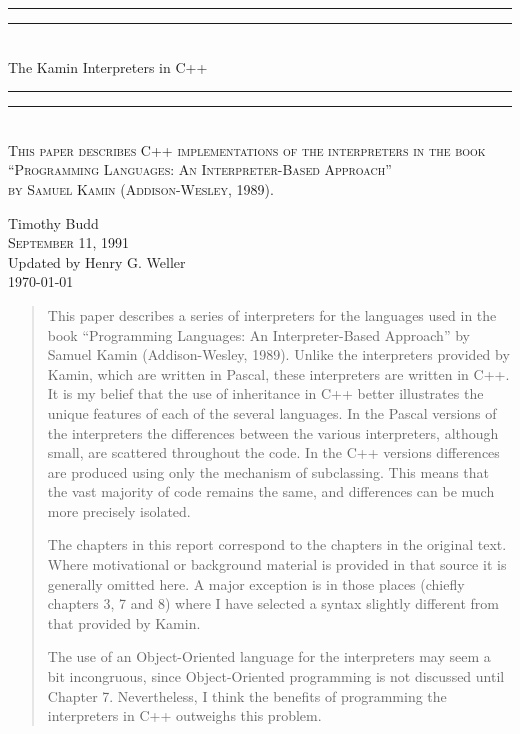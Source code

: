 \documentclass[10pt,twoside,a4paper]{report}
\newlength{\drop}
\begin{document}
\begin{titlepage}
    \textheight
    \centering
    \vspace*{\baselineskip}
    \rule{\textwidth}{1.6pt}\vspace*{-\baselineskip}\vspace*{2pt}
    \rule{\textwidth}{0.4pt}\\[\baselineskip]
    {\LARGE The Kamin Interpreters in C++}\\[0.2\baselineskip]
    \rule{\textwidth}{0.4pt}\vspace*{-\baselineskip}\vspace{3.2pt}
    \rule{\textwidth}{1.6pt}\\[\baselineskip]
    \scshape
    This paper describes C++ implementations of the interpreters in the book \\
    ``Programming Languages: An Interpreter-Based Approach'' \\
    by Samuel Kamin (Addison-Wesley, 1989).\par
    \vspace*{2\baselineskip}
    Timothy Budd \\
    {\scshape September 11, 1991}  \\[\baselineskip]
    Updated by Henry G. Weller \\
    {\scshape \today}
\end{titlepage}

\cleardoublepage

\begin{abstract}
    This paper describes a series of interpreters for the languages used in the
    book ``Programming Languages: An Interpreter-Based Approach'' by Samuel
    Kamin (Addison-Wesley, 1989).  Unlike the interpreters provided by Kamin,
    which are written in Pascal, these interpreters are written in C++.  It is
    my belief that the use of inheritance in C++ better illustrates the unique
    features of each of the several languages.  In the Pascal versions of the
    interpreters the differences between the various interpreters, although
    small, are scattered throughout the code.  In the C++ versions differences
    are produced using only the mechanism of subclassing.  This means that the
    vast majority of code remains the same, and differences can be much more
    precisely isolated.

    The chapters in this report correspond to the chapters in the original text.
    Where motivational or background material is provided in that source it is
    generally omitted here.  A major exception is in those places (chiefly
    chapters 3, 7 and 8) where I have selected a syntax slightly different from
    that provided by Kamin.

    The use of an Object-Oriented language for the interpreters may seem a bit
    incongruous, since Object-Oriented programming is not discussed until
    Chapter 7.  Nevertheless, I think the benefits of programming the
    interpreters in C++ outweighs this problem.
\end{abstract}

\tableofcontents
\listoffigures
\lstlistoflistings











\end{document}
